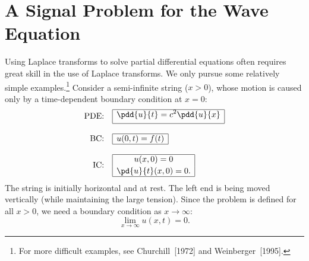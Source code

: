 \section{A Signal Problem for the Wave Equation}
\label{sec:13.4}

Using Laplace transforms to solve partial differential equations often requires great skill in the use of Laplace transforms.  We only pursue some relatively simple examples.\footnote{For more difficult examples, see Churchill~[1972] and Weinberger~[1995].}  Consider a semi-infinite string ($x > 0$), whose motion is caused only by a time-dependent boundary condition at $x = 0$:
\begin{align}
\text{PDE:}\quad &
\begin{array}{|c|}
\hline
\displaystyle\pdd{u}{t} = c^2\pdd{u}{x} \\[4pt]
\hline
\end{array}
\label{eq:13.4.1} \\[8pt]
\text{BC:}\quad &
\begin{array}{|c|}
\hline
u(0,t) = f(t) \\
\hline
\end{array}
\label{eq:13.4.2} \\[8pt]
\text{IC:}\quad &
\begin{array}{|c|}
\hline
u(x,0) = 0 \\[2pt]
\displaystyle\pd{u}{t}(x,0) = 0. \\
\hline
\end{array}
\label{eq:13.4.3}
\end{align}
The string is initially horizontal and at rest.  The left end is being moved vertically (while maintaining the large tension).  Since the problem is defined for all $x > 0$, we need a boundary condition as $x \to \infty$:
\begin{equation}
\lim_{x\to\infty} u(x,t) = 0.
\label{eq:13.4.4}
\end{equation}

